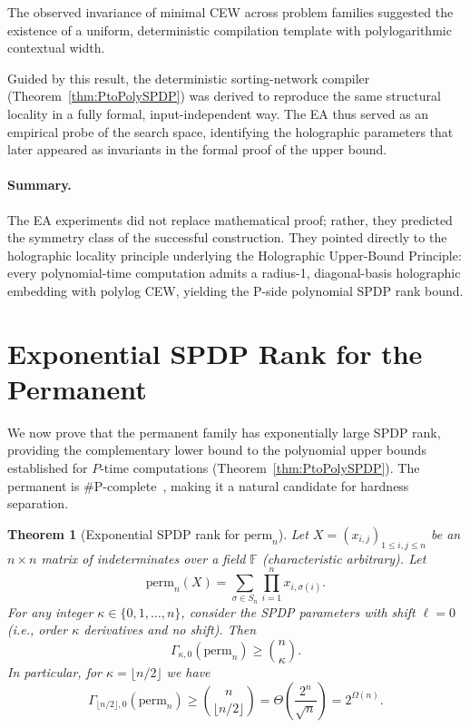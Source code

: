 \documentclass[12pt]{article}
\newtheorem{theorem}{Theorem}
\theoremstyle{definition}
\theoremstyle{definition}
\theoremstyle{remark}
\theoremstyle{remark}
\begin{document}
The observed invariance of minimal CEW across problem families suggested the existence of a uniform, deterministic compilation template with polylogarithmic contextual width.

Guided by this result, the deterministic sorting-network compiler (Theorem~\ref{thm:PtoPolySPDP}) was derived to reproduce the same structural locality in a fully formal, input-independent way. The EA thus served as an empirical probe of the search space, identifying the holographic parameters that later appeared as invariants in the formal proof of the upper bound.

\paragraph{Summary.}
The EA experiments did not replace mathematical proof; rather, they predicted the symmetry class of the successful construction. They pointed directly to the holographic locality principle underlying the Holographic Upper-Bound Principle: every polynomial-time computation admits a radius-1, diagonal-basis holographic embedding with polylog CEW, yielding the P-side polynomial SPDP rank bound.


\section{Exponential SPDP Rank for the Permanent}
\label{sec:perm-lower-bound}

We now prove that the permanent family has exponentially large SPDP rank,
providing the complementary lower bound to the polynomial upper bounds established
for $P$-time computations (Theorem~\ref{thm:PtoPolySPDP}). The permanent is \#P-complete~\cite{valiant1979}, making it a natural candidate for hardness separation.

\begin{theorem}[Exponential SPDP rank for $\mathrm{perm}_n$]\label{thm:perm-exp-rank}
Let $X = (x_{i,j})_{1 \leq i,j \leq n}$ be an $n \times n$ matrix of indeterminates over a field $\mathbb{F}$ (characteristic arbitrary). Let
\[
\mathrm{perm}_n(X) = \sum_{\sigma \in S_n} \prod_{i=1}^n x_{i,\sigma(i)}.
\]
For any integer $\kappa \in \{0,1,\ldots,n\}$, consider the SPDP parameters with shift $\ell=0$ (i.e., order $\kappa$ derivatives and no shift). Then
\[
\Gamma_{\kappa,0}(\mathrm{perm}_n) \geq \binom{n}{\kappa}.
\]
In particular, for $\kappa = \lfloor n/2 \rfloor$ we have
\[
\Gamma_{\lfloor n/2 \rfloor, 0}(\mathrm{perm}_n) \geq \binom{n}{\lfloor n/2 \rfloor} = \Theta\!\left(\frac{2^n}{\sqrt{n}}\right) = 2^{\Omega(n)}.
\]
\end{theorem}
\end{document}
